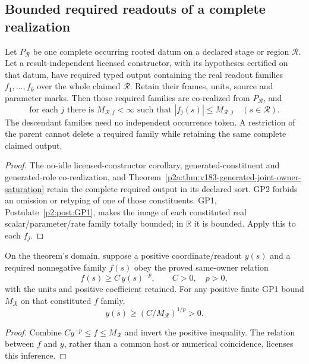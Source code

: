 \documentclass[12pt,a4paper]{article}
\begin{document}
\subsection{Bounded required readouts of a complete realization}
\label{p2a:sec:bounded-generated-readouts}

\begin{theorem}
\label{p2a:thm:bounded-required-readout-family}
Let \(P_{\mathcal R}\) be one complete occurring rooted datum on a declared
stage or region \(\mathcal R\). Let a result-independent licensed constructor,
with its hypotheses certified on that datum, have required typed output
containing the real readout families \(f_1,\ldots,f_k\) over the whole claimed
\(\mathcal R\). Retain their frames, units, source and parameter marks.
Then those required families are co-realized from \(P_{\mathcal R}\), and
\[
 \boxed{\text{for each }j\text{ there is }M_{\mathcal R,j}<\infty
 \text{ such that }|f_j(s)|\leq M_{\mathcal R,j}
 \quad(s\in\mathcal R).}
\]
The descendant families need no independent occurrence token. A restriction
of the parent cannot delete a required family while retaining the same
complete claimed output.
\end{theorem}
\begin{proof}
The no-idle licensed-constructor corollary, generated-constituent and
generated-role co-realization, and
Theorem~\ref{p2a:thm:v183-generated-joint-owner-saturation} retain the complete
required output in its declared sort. GP2 forbids an omission or retyping of
one of those constituents. GP1, Postulate~\ref{p2:post:GP1}, makes the image
of each constituted real scalar/parameter/rate family totally bounded;
in \(\mathbb R\) it is bounded. Apply this to each \(f_j\).
\end{proof}

\begin{corollary}
\label{p2a:cor:bounded-inverse-readout-compression}
On the theorem's domain, suppose a positive coordinate/readout \(y(s)\)
and a required nonnegative family \(f(s)\) obey the proved same-owner relation
\[
 f(s)\geq C\,y(s)^{-p},\qquad C>0,\quad p>0,
\]
with the units and positive coefficient retained. For any positive finite
GP1 bound \(M_{\mathcal R}\) on that constituted \(f\) family,
\[
 \boxed{y(s)\geq(C/M_{\mathcal R})^{1/p}>0.}
\]
\end{corollary}
\begin{proof}
Combine \(C y^{-p}\leq f\leq M_{\mathcal R}\) and invert the positive
inequality. The relation between \(f\) and \(y\), rather than a common host
or numerical coincidence, licenses this inference.
\end{proof}
\end{document}
